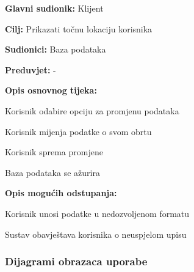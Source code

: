 					\noindent {}
					\begin{packed_item}
	
						\item \textbf{Glavni sudionik: }Klijent
						\item  \textbf{Cilj:} Prikazati točnu lokaciju korisnika
						\item  \textbf{Sudionici:} Baza podataka
						\item  \textbf{Preduvjet:} -
						\item  \textbf{Opis osnovnog tijeka:}
						
						\item[] \begin{packed_enum}
	
							\item Korisnik odabire opciju za promjenu podataka
							\item Korisnik mijenja podatke o svom obrtu
							\item Korisnik sprema promjene
							\item Baza podataka se ažurira

						\end{packed_enum}
						
						\item  \textbf{Opis mogućih odstupanja:}
						
						\item[] \begin{packed_item}
	
							\item[2.a] Korisnik unosi podatke u nedozvoljenom formatu
							\item[] \begin{packed_enum}
								
								\item Sustav obavještava korisnika o neuspjelom upisu
								
							\end{packed_enum}
							
						\end{packed_item}
						
					\end{packed_item}
					
					
				
					
				\subsubsection{Dijagrami obrazaca uporabe}
					
